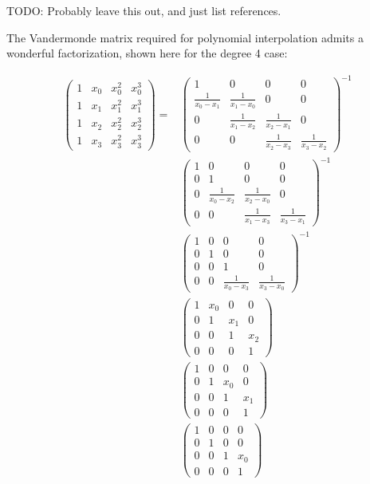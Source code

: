 \documentclass[11pt]{article}
\newcommand{\TODO}{{\color{red} TODO}}
\begin{document}
\TODO: Probably leave this out, and just list references.

The Vandermonde matrix required for polynomial interpolation admits a wonderful factorization, shown here for the degree 4 case:

\begin{align*}
\left(\begin{matrix}1 & x_{0} & x_{0}^{2} & x_{0}^{3}\\1 & x_{1} & x_{1}^{2} & x_{1}^{3}\\1 & x_{2} & x_{2}^{2} & x_{2}^{3}\\1 & x_{3} & x_{3}^{2} & x_{3}^{3}\end{matrix}\right)
=& \left(\begin{matrix}1&0&0&0\\\frac{1}{x_{0}-x_{1}}&\frac{1}{x_{1}-x_{0}}&0&0\\0&\frac{1}{x_{1}-x_{2}}&\frac{1}{x_{2}-x_{1}}&0\\0&0&\frac{1}{x_{2}-x_{3}}&\frac{1}{x_{3}-x_{2}}\end{matrix}\right)^{-1} \\
 & \left(\begin{matrix}1&0&0&0\\0&1&0&0\\0&\frac{1}{x_{0}-x_{2}}&\frac{1}{x_{2}-x_{0}}&0\\0&0&\frac{1}{x_{1}-x_{3}}&\frac{1}{x_{3}-x_{1}}\end{matrix}\right)^{-1} \\
 & \left(\begin{matrix}1&0&0&0\\0&1&0&0\\0&0&1&0\\0&0&\frac{1}{x_{0}-x_{3}}&\frac{1}{x_{3}-x_{0}}\end{matrix}\right)^{-1} \\
 & \left(\begin{matrix}1&x_{0}&0&0\\0&1&x_{1}&0\\0&0&1&x_{2}\\0&0&0&1\end{matrix}\right) \\
 & \left(\begin{matrix}1&0&0&0\\0&1&x_{0}&0\\0&0&1&x_{1}\\0&0&0&1\end{matrix}\right) \\
 & \left(\begin{matrix}1&0&0&0\\0&1&0&0\\0&0&1&x_{0}\\0&0&0&1\end{matrix}\right) 
\end{align*}
\end{document}
